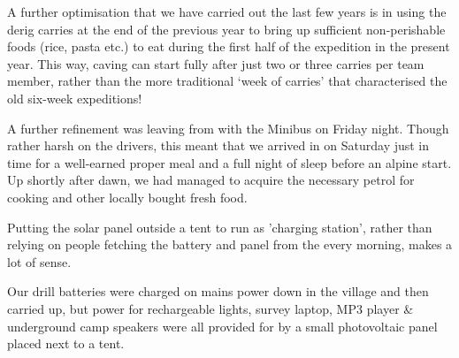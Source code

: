 A further optimisation that we have carried out the last few years is in
using the derig carries at the end of the previous year to bring up
sufficient non-perishable foods (rice, pasta etc.) to eat during the
first half of the expedition in the present year. This way, caving can
start fully after just two or three carries per team member, rather than
the more traditional `week of carries' that characterised the old
six-week expeditions!

A further refinement was leaving from  with the Minibus on Friday
night. Though rather harsh on the drivers, this meant that we arrived in
 on Saturday just in time for a well-earned proper meal and a full
night of sleep before an alpine start. Up shortly after dawn, we had
managed to acquire the necessary petrol for cooking and other locally
bought fresh food.

\begin{marginfigure}
\checkoddpage \ifoddpage \forcerectofloat \else \forceversofloat \fi
\centering
 \caption{Putting the solar panel outside a tent to run as 'charging station', rather than relying on people fetching the battery and panel from the  every morning, makes a lot of sense. }
 \label{panel F10}
\end{marginfigure}

Our drill batteries were charged on mains power down in the village and
then carried up, but power for rechargeable lights, survey laptop, MP3
player \& underground camp speakers were all provided for by a small
photovoltaic panel placed next to a tent.





